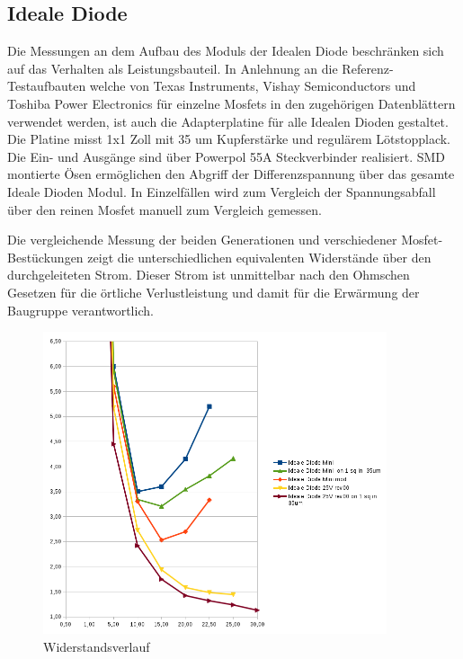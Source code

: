 \subsection{Ideale Diode}

Die Messungen an dem Aufbau des Moduls der Idealen Diode beschränken sich auf das Verhalten als Leistungsbauteil. 
In Anlehnung an die Referenz-Testaufbauten welche von Texas Instruments, Vishay Semiconductors und Toshiba Power Electronics für einzelne Mosfets in den zugehörigen Datenblättern verwendet werden, ist auch die Adapterplatine für alle Idealen Dioden gestaltet.
Die Platine misst 1x1 Zoll mit 35 um Kupferstärke und regulärem Lötstopplack. Die Ein- und Ausgänge sind über Powerpol 55A Steckverbinder realisiert. SMD montierte Ösen ermöglichen den Abgriff der Differenzspannung über das gesamte Ideale Dioden Modul. In Einzelfällen wird zum Vergleich der Spannungsabfall über den reinen Mosfet manuell zum Vergleich gemessen.

Die vergleichende Messung der beiden Generationen und verschiedener Mosfet-Bestückungen zeigt die unterschiedlichen equivalenten Widerstände über den durchgeleiteten Strom.
Dieser Strom ist unmittelbar nach den Ohmschen Gesetzen für die örtliche Verlustleistung und damit für die Erwärmung der Baugruppe verantwortlich.

\begin{figure}[H]
\centering
\includegraphics[width=0.9\textwidth]{graphen/Wiederstand-Strom-Ideale_Diode_ver00} 
\caption{Widerstandsverlauf} 
\label{fig:Widerstandsverlauf}
\end{figure}


